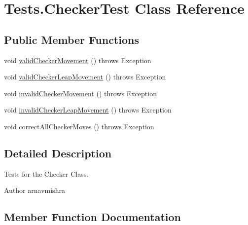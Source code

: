 \hypertarget{class_tests_1_1_checker_test}{}\section{Tests.\+Checker\+Test Class Reference}
\label{class_tests_1_1_checker_test}
\subsection*{Public Member Functions}
\begin{DoxyCompactItemize}
\item 
void \hyperlink{class_tests_1_1_checker_test_a93db61a292d48963a5ab97e349c910c3}{valid\+Checker\+Movement} ()  throws Exception 
\item 
void \hyperlink{class_tests_1_1_checker_test_a35af29acb3ae72737413763ace0f911e}{valid\+Checker\+Leap\+Movement} ()  throws Exception 
\item 
void \hyperlink{class_tests_1_1_checker_test_ac9d201b3122764534da6751a881509ee}{invalid\+Checker\+Movement} ()  throws Exception 
\item 
void \hyperlink{class_tests_1_1_checker_test_abff00b6e6dc767071f07e864a4636a63}{invalid\+Checker\+Leap\+Movement} ()  throws Exception 
\item 
void \hyperlink{class_tests_1_1_checker_test_a5eff464f77823f680ce240ca305bbbd9}{correct\+All\+Checker\+Moves} ()  throws Exception 
\end{DoxyCompactItemize}


\subsection{Detailed Description}
Tests for the Checker Class. \begin{DoxyAuthor}{Author}
arnavmishra 
\end{DoxyAuthor}


\subsection{Member Function Documentation}
\hypertarget{class_tests_1_1_checker_test_a5eff464f77823f680ce240ca305bbbd9}{}\label{class_tests_1_1_checker_test_a5eff464f77823f680ce240ca305bbbd9} 

